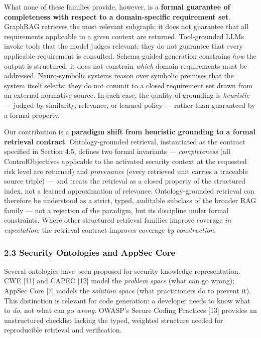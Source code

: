 \documentclass[
]{article}
\begin{document}
What none of these families provide, however, is a \textbf{formal
guarantee of completeness with respect to a domain-specific requirement
set}. GraphRAG retrieves the most relevant subgraph; it does not
guarantee that all requirements applicable to a given context are
returned. Tool-grounded LLMs invoke tools that the model judges
relevant; they do not guarantee that every applicable requirement is
consulted. Schema-guided generation constrains \emph{how} the output is
structured; it does not constrain \emph{which} domain requirements must
be addressed. Neuro-symbolic systems reason over symbolic premises that
the system itself selects; they do not commit to a closed requirement
set drawn from an external normative source. In each case, the quality
of grounding is \emph{heuristic} --- judged by similarity, relevance, or
learned policy --- rather than guaranteed by a formal property.

Our contribution is a \textbf{paradigm shift from heuristic grounding to
a formal retrieval contract}. Ontology-grounded retrieval, instantiated
as the contract specified in Section 4.5, defines two formal invariants
--- \emph{completeness} (all ControlObjectives applicable to the
activated security context at the requested risk level are returned) and
\emph{provenance} (every retrieved unit carries a traceable source
triple) --- and treats the retrieval as a closed property of the
structured index, not a learned approximation of relevance.
Ontology-grounded retrieval can therefore be understood as a strict,
typed, auditable subclass of the broader RAG family --- not a rejection
of the paradigm, but its discipline under formal constraints. Where
other structured retrieval families improve coverage \emph{in
expectation}, the retrieval contract improves coverage \emph{by
construction}.

\subsubsection{2.3 Security Ontologies and AppSec
Core}\label{security-ontologies-and-appsec-core}

Several ontologies have been proposed for security knowledge
representation. CWE {[}11{]} and CAPEC {[}12{]} model the \emph{problem
space} (what can go wrong); AppSec Core {[}7{]} models the
\emph{solution space} (what practitioners do to prevent it). This
distinction is relevant for code generation: a developer needs to know
what to \emph{do}, not what can go \emph{wrong}. OWASP's Secure Coding
Practices {[}13{]} provides an unstructured checklist lacking the typed,
weighted structure needed for reproducible retrieval and verification.
\end{document}
